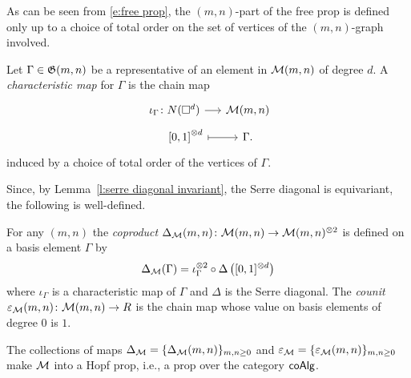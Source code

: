 As can be seen from \eqref{e:free prop}, the $(m,n)$-part of the free prop is defined only up to a choice of total order on the set of vertices of the $(m,n)$-graph involved.

\begin{definition}
	Let $\Gamma \in \mathfrak{G}(m,n)$ be a representative of an element in $\mathcal{M}(m,n)$ of degree $d$. A \textit{characteristic map} for $\Gamma$ is the chain map \vspace*{-5pt}
	\begin{equation} \label{e:order chain map}
	\begin{tikzcd}[row sep=tiny, column sep=small]
	\iota_\Gamma \colon \cchains(\square^d) \arrow[r] & \M(m,n) \\
	\qquad {[0,1]}^{\otimes d} \arrow[r, |->] & \Gamma.
	\end{tikzcd}
	\end{equation}
	induced by a choice of total order of the vertices of $\Gamma$.
\end{definition}

Since, by Lemma~\ref{l:serre diagonal invariant}, the Serre diagonal is equivariant, the following is well-defined.
\begin{definition}
	For any $(m,n)$ the \textit{coproduct} $\Delta_{\mathcal{M}}(m,n) \colon \mathcal{M}(m,n) \to \mathcal{M}(m,n)^{\otimes 2}$ is defined on a basis element $\Gamma$ by
	\begin{equation} \label{e:diagonal of M}
	\Delta_{\mathcal{M}}(\Gamma) = \iota_\Gamma^{\otimes 2} \circ \Delta \left([0,1]^{\otimes d}\right)
	\end{equation}
	where $\iota_\Gamma$ is a characteristic map of $\Gamma$ and $\Delta$ is the Serre diagonal.
	The \textit{counit} $\varepsilon_{\mathcal{M}}(m,n) \colon \mathcal{M}(m,n) \to R$ is the chain map whose value on basis elements of degree $0$ is $1$. 
\end{definition}

\begin{theorem}
	The collections of maps $\Delta_{\mathcal{M}} = \{\Delta_{\mathcal{M}}(m,n)\}_{m,n \geq 0}$ and $\varepsilon_{\mathcal{M}} = \{\varepsilon_{\mathcal{M}}(m,n)\}_{m,n\geq0}$ make $\mathcal{M}$ into a Hopf prop, i.e., a prop over the category $\mathsf{coAlg}$.
\end{theorem}

